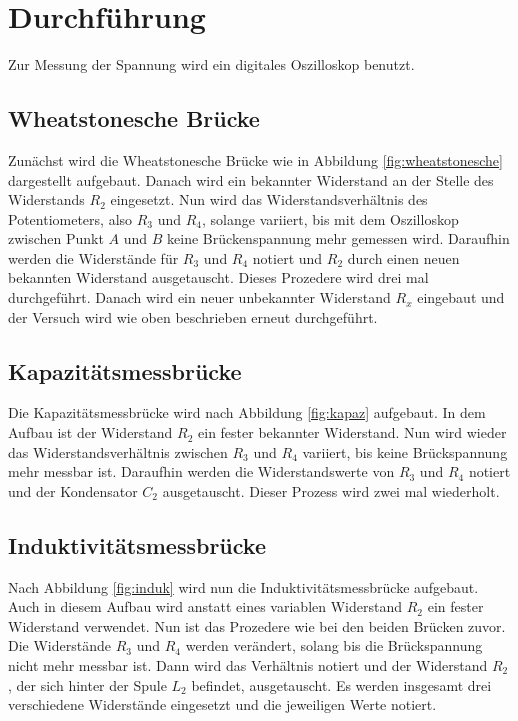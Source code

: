 \section{Durchführung}
\label{sec:Durchführung}

Zur Messung der Spannung wird ein digitales Oszilloskop benutzt.

\subsection{Wheatstonesche Brücke}

Zunächst wird die Wheatstonesche Brücke wie in Abbildung \ref{fig:wheatstonesche} dargestellt aufgebaut.
Danach wird ein bekannter Widerstand an der Stelle des Widerstands $R_2$ eingesetzt.
Nun wird das Widerstandsverhältnis des Potentiometers, also $R_3$ und $R_4$, solange variiert, bis mit dem Oszilloskop zwischen Punkt $A$ und $B$ keine Brückenspannung mehr gemessen wird.
Daraufhin werden die Widerstände für $R_3$ und $R_4$ notiert und $R_2$ durch einen neuen bekannten Widerstand ausgetauscht.
Dieses Prozedere wird drei mal durchgeführt.
Danach wird ein neuer unbekannter Widerstand $R_x$ eingebaut und der Versuch wird wie oben beschrieben erneut durchgeführt.

\subsection{Kapazitätsmessbrücke}

Die Kapazitätsmessbrücke wird nach Abbildung \ref{fig:kapaz} aufgebaut.
In dem Aufbau ist der Widerstand $R_2$ ein fester bekannter Widerstand.
Nun wird wieder das Widerstandsverhältnis zwischen $R_3$ und $R_4$ variiert, bis keine Brückspannung mehr messbar ist.
Daraufhin werden die Widerstandswerte von $R_3$ und $R_4$ notiert und der Kondensator $C_2$ ausgetauscht.
Dieser Prozess wird zwei mal wiederholt.

\subsection{Induktivitätsmessbrücke}

Nach Abbildung \ref{fig:induk} wird nun die Induktivitätsmessbrücke aufgebaut.
Auch in diesem Aufbau wird anstatt eines variablen Widerstand $R_2$ ein fester Widerstand verwendet.
Nun ist das Prozedere wie bei den beiden Brücken zuvor. Die Widerstände $R_3$ und $R_4$ werden verändert, solang bis die Brückspannung nicht mehr messbar ist.
Dann wird das Verhältnis notiert und der Widerstand $R_2$, der sich hinter der Spule $L_2$ befindet, ausgetauscht.
Es werden insgesamt drei verschiedene Widerstände eingesetzt und die jeweiligen Werte notiert.

